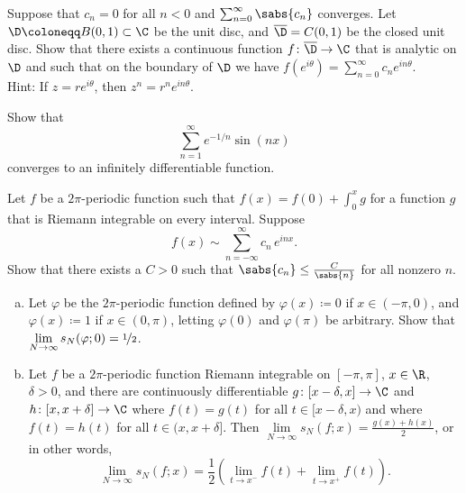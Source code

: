 \begin{exercise}
Suppose that $c_n = 0$ for all $n < 0$ and $\sum_{n=0}^\infty \sabs{c_n}$
converges.  Let $\D \coloneqq B(0,1) \subset \C$ be the unit disc,
and $\overline{\D} = C(0,1)$ be the closed unit disc.
Show that there exists a continuous function
$f \colon \overline{\D} \to \C$ that is analytic on $\D$
and such that on the boundary of $\D$ we have
$f(e^{i\theta}) = \sum_{n=0}^\infty c_n e^{in\theta}$.\\
Hint: If $z=re^{i\theta}$, then $z^n = r^n e^{in\theta}$.
\end{exercise}

\begin{exercise}
Show that
\begin{equation*}
\sum_{n=1}^\infty e^{-1/n} \sin(n x)
\end{equation*}
converges to an infinitely differentiable function.
\end{exercise}

\begin{exercise} \label{exercise:fsdiffmindecay}
Let $f$ be a $2\pi$-periodic function
such that $f(x) = f(0) + \int_0^x g$
for a function $g$ that is Riemann integrable on every interval.
Suppose
\begin{equation*}
f(x) \sim
\sum_{n=-\infty}^\infty c_n \,e^{inx} .
\end{equation*}
Show that there exists a $C > 0$ such that
$\sabs{c_n} \leq \frac{C}{\sabs{n}}$ for all nonzero $n$.
\end{exercise}

\begin{exercise}
\leavevmode
\begin{enumerate}[a)]
\item
Let $\varphi$ be the $2\pi$-periodic function 
defined by $\varphi(x) \coloneqq 0$ if $x \in (-\pi,0)$,
and $\varphi(x) \coloneqq 1$ if $x \in (0,\pi)$,
letting $\varphi(0)$ and $\varphi(\pi)$ be arbitrary.  Show
that $\lim\limits_{N \to \infty} s_N(\varphi;0) = \nicefrac{1}{2}$.
\item
Let $f$ be a $2\pi$-periodic function
Riemann integrable on $[-\pi,\pi]$, 
$x \in \R$, $\delta > 0$, and
there are continuously differentiable
$g \colon [x-\delta,x] \to \C$
and $h \colon [x,x+\delta] \to \C$
where $f(t) = g(t)$ for all $t \in [x-\delta,x)$
and
where $f(t) = h(t)$ for all $t \in (x,x+\delta]$.
Then
$\lim\limits_{N\to\infty} s_N(f;x) = \frac{g(x)+h(x)}{2}$, or in other words,
\begin{equation*}
\lim_{N \to \infty} s_N(f;x) =
\frac{1}{2}
\left(
\lim_{t \to x^-} f(t) +
\lim_{t \to x^+} f(t)
\right) .
\end{equation*}
\end{enumerate}
\end{exercise}

